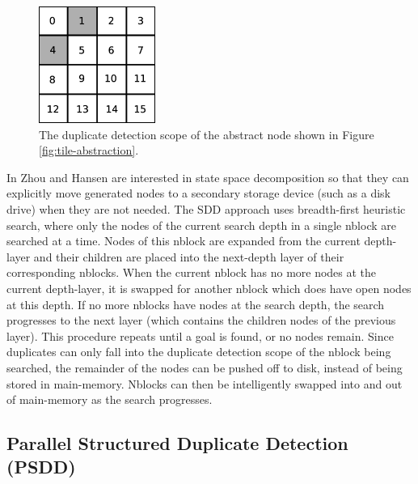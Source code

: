 \documentclass{article} \usepackage{aaai} \usepackage{graphicx}
\begin{document}
\begin{figure}[t]
\begin{center}
\includegraphics[width=1.5in]{images/duplicate-detection-scope.eps}
\caption{The duplicate detection scope of the abstract node shown in
  Figure \ref{fig:tile-abstraction}.}
\label{fig:duplicate-detection-scope}
\end{center}
\end{figure}

In \cite{zhou:sdd} Zhou and Hansen are interested in state space
decomposition so that they can explicitly move generated nodes to a
secondary storage device (such as a disk drive) when they are not
needed.  The SDD approach uses breadth-first heuristic search, where
only the nodes of the current search depth in a single nblock are
searched at a time.  Nodes of this nblock are expanded from the
current depth-layer and their children are placed into the next-depth
layer of their corresponding nblocks.  When the current nblock has no
more nodes at the current depth-layer, it is swapped for another
nblock which does have open nodes at this depth.  If no more nblocks
have nodes at the search depth, the search progresses to the next
layer (which contains the children nodes of the previous layer).  This
procedure repeats until a goal is found, or no nodes remain. Since
duplicates can only fall into the duplicate detection scope of the
nblock being searched, the remainder of the nodes can be pushed off to
disk, instead of being stored in main-memory.  Nblocks can then be
intelligently swapped into and out of main-memory as the search
progresses.

\subsection{Parallel Structured Duplicate Detection (PSDD)}
\end{document}
